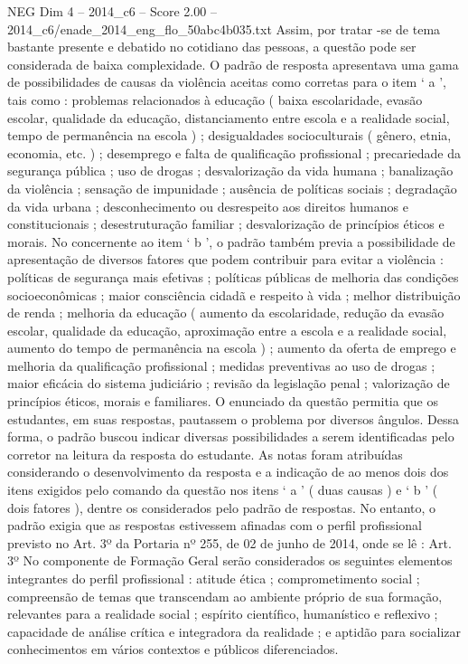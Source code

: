 \begin{textsample}{NEG Dim 4 – 2014\_c6 – Score 2.00 – 2014\_c6/enade\_2014\_eng\_flo\_50abc4b035.txt}
Assim, por tratar -se de tema bastante presente e debatido no cotidiano das pessoas, a questão pode ser considerada de baixa complexidade.
O padrão de resposta apresentava uma gama de possibilidades de causas da violência aceitas como corretas para o item ‘ a ’, tais como : problemas relacionados à educação ( baixa escolaridade, evasão escolar, qualidade da educação, distanciamento entre escola e a realidade social, tempo de permanência na escola ) ; desigualdades socioculturais ( gênero, etnia, economia, etc. ) ; desemprego e falta de qualificação profissional ; precariedade da segurança pública ; uso de drogas ; desvalorização da vida humana ; banalização da violência ; sensação de impunidade ; ausência de políticas sociais ; degradação da vida urbana ; desconhecimento ou desrespeito aos direitos humanos e constitucionais ; desestruturação familiar ; desvalorização de princípios éticos e morais.
No concernente ao item ‘ b ’, o padrão também previa a possibilidade de apresentação de diversos fatores que podem contribuir para evitar a violência : políticas de segurança mais efetivas ; políticas públicas de melhoria das condições socioeconômicas ; maior consciência cidadã e respeito à vida ; melhor distribuição de renda ; melhoria da educação ( aumento da escolaridade, redução da evasão escolar, qualidade da educação, aproximação entre a escola e a realidade social, aumento do tempo de permanência na escola ) ; aumento da oferta de emprego e melhoria da qualificação profissional ; medidas preventivas ao uso de drogas ; maior eficácia do sistema judiciário ; revisão da legislação penal ; valorização de princípios éticos, morais e familiares.
O enunciado da questão permitia que os estudantes, em suas respostas, pautassem o problema por diversos ângulos.
Dessa forma, o padrão buscou indicar diversas possibilidades a serem identificadas pelo corretor na leitura da resposta do estudante.
As notas foram atribuídas considerando o desenvolvimento da resposta e a indicação de ao menos dois dos itens exigidos pelo comando da questão nos itens ‘ a ’ ( duas causas ) e ‘ b ’ ( dois fatores ), dentre os considerados pelo padrão de respostas.
No entanto, o padrão exigia que as respostas estivessem afinadas com o perfil profissional previsto no Art. 3º da Portaria nº 255, de 02 de junho de 2014, onde se lê : Art. 3º No componente de Formação Geral serão considerados os seguintes elementos integrantes do perfil profissional : atitude ética ; comprometimento social ; compreensão de temas que transcendam ao ambiente próprio de sua formação, relevantes para a realidade social ; espírito científico, humanístico e reflexivo ; capacidade de análise crítica e integradora da realidade ; e aptidão para socializar conhecimentos em vários contextos e públicos diferenciados.

\end{textsample}
